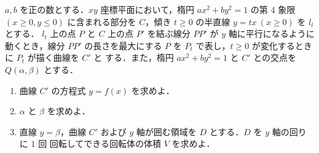\documentclass[a4paper,10pt]{ltjsarticle}
\begin{document}
\begin{oframed}
  $a, b$ を正の数とする．$xy$ 座標平面において，楕円 $ax^2 + by^2 = 1$ の第 4 象限
  $(x \ge 0, y \le 0)$ に含まれる部分を $C$，傾き $t \ge 0$ の半直線 $y = tx \ (x \ge 0)$ を $l_t$ とする．
  $l_t$ 上の点 $P$ と $C$ 上の点 $P'$ を結ぶ線分 $PP'$ が $y$ 軸に平行になるように動くとき，線分
  $PP'$ の長さを最大にする $P$ を $P_t$ で表し，$t \ge 0$ が変化するときに $P_t$ が描く曲線を $C'$ と
  する．また，楕円 $ax^2 + by^2 = 1$ と $C'$ との交点を $Q(\alpha, \beta)$ とする．

  \begin{enumerate}
    \item 曲線 $C'$ の方程式 $y = f(x)$ を求めよ．
    \item $\alpha$ と $\beta$ を求めよ．
    \item 直線 $y = \beta$，曲線 $C'$ および $y$ 軸が囲む領域を $D$ とする．$D$ を $y$ 軸の回りに $1$ 回
          回転してできる回転体の体積 $V$ を求めよ．
  \end{enumerate}
\end{oframed}
\setlength{\columnseprule}{0.4pt}
\end{document}
